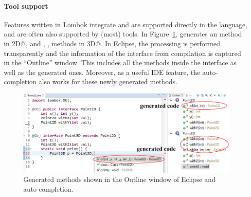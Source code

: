 \paragraph{Tool support}
Features written in Lombok integrate and are supported directly in the
language, and are often also supported by (most) tools.  
In Figure~\ref{fig:screenshot},
\mixin generates an \Q@of@ method in \Q@Point2D@, and \Q@of@, \Q@withX@, \Q@withY@ methods in \Q@Point3D@.
In Eclipse, the processing is
performed transparently and the information of the interface from
compilation is captured in the ``Outline'' window.
This includes all
the methods inside the interface as well as the generated ones.
Moreover, as a useful IDE feature, the auto-completion also works for these newly generated methods.

\begin{figure}[t]
\saveSpaceFig
\saveSpaceFig
\centering
\includegraphics[width=5in]{pdfs/screenshot4.png}
\caption{Generated methods shown in the Outline window of Eclipse and auto-completion.}
\label{fig:screenshot}
\saveSpaceFig
\end{figure}

